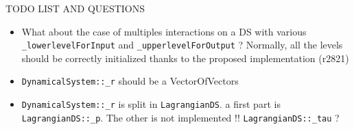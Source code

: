 TODO LIST AND QUESTIONS
\begin{itemize}
\item What about the case of multiples interactions on a DS with various {\tt \_lowerlevelForInput} and {\tt \_upperlevelForOutput} ? Normally, all the levels should be correctly initialized thanks to the proposed implementation (r2821)
\item {\tt DynamicalSystem::\_r} should be a VectorOfVectors
\item {\tt DynamicalSystem::\_r} is split in {\tt LagrangianDS}. a first part is {\tt LagrangianDS::\_p}. The other is not implemented !! {\tt LagrangianDS::\_tau} ?
\end{itemize}


